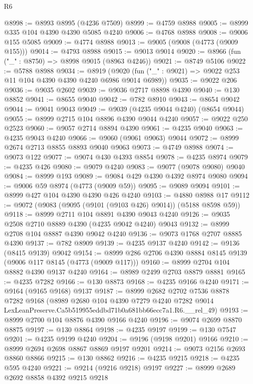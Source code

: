 \begin{lexlean}{R6}
\begin{coremodule}
@8998 := @8993 @8995 (@4236 @7509)
@8999 := @4759 @8988
@9005 := @8999 @335 @104 @4390 @4390 @5085 @4240
@9006 := @4768 @8988
@9008 := @9006 @155 @5085
@9009 := @4774 @8988
@9013 := @9005 (@9008 (@4773 (@9009 @155)))
@9014 := @4793 @8988
@9015 := @9013 @9014
@9020 := @8966 (fun ("_" : @8750) => @8998 @9015 (@8963 @4246))
@9021 := @8749 @5106
@9022 := @5788 @8988
@9034 := @8919
    (@9020 (fun ("_" : @9021) => @9022 @253 @11 @104 @4390 @4390 @4240 @6986 @9014 @6989))
@9035 := @9022 @206
@9036 := @9035 @2602
@9039 := @9036 @2717 @8898 @4390
@9040 := @130 @8852
@9041 := @8655 @9040
@9042 := @782 @8910
@9043 := @8654 @9042
@9044 := @9041 @9043
@9049 := @9039 (@4235 @9044 @4240) (@8654 @9044)
@9055 := @8999 @2715 @104 @8896 @4390 @9044 @4240
@9057 := @9022 @250 @2523
@9060 := @9057 @2714 @8894 @4390
@9061 := @4235 @9040
@9063 := @4235 @9043 @4240
@9066 := @9060 (@9061 @9063) @9044
@9072 := @8999 @2674 @2713 @8855 @8893 @9040 @9063
@9073 := @4749 @8988
@9074 := @9073 @122
@9077 := @9074 @430 @4393 @8854
@9078 := @4235 @8974
@9079 := @4235 @426
@9080 := @9079 @4240
@9083 := @9077 (@9078 @9080) @9040
@9084 := @8999 @193
@9089 := @9084 @429 @4390 @4392 @8974 @9080
@9094 := @9006 @59 @8974 (@4773 (@9009 @59))
@9095 := @9089 @9094
@9101 := @8999 @427 @104 @4390 @4390 @426 @4240
@9103 := @4880 @8988 @17
@9112 := @9072 (@9083 (@9095 (@9101 (@9103 @426) @9014)) (@5188 @8598 @59))
@9118 := @8999 @2711 @104 @8891 @4390 @9043 @4240
@9126 := @9035 @2508 @2710 @8889 @4390 (@4235 @9042 @4240) @9043
@9132 := @8999 @2708 @104 @8887 @4390 @9042 @4240
@9136 := @9073 @1768 @2707 @8885 @4390
@9137 := @782 @8909
@9139 := @4235 @9137 @4240
@9142 := @9136 (@8415 @9139) @9042
@9154 := @8999 @286 @2706 @4390 @8884 @8145 @9139 (@9006 @117 @8145 (@4773 (@9009 @117)))
@9160 := @8999 @2704 @104 @8882 @4390 @9137 @4240
@9164 := @8989 @2499 @2703 @8879 @8881
@9165 := @4235 @7282
@9166 := @130 @8873
@9168 := @4235 @9166 @4240
@9171 := @9164 (@9165 @9168) @9137
@9187 := @8999
    @2682
    @2702
    @7536
    @8878
    @7282
    @9168
    (@8989
      @2680
      @104
      @4390
      @7279
      @4240
      @7282
      @9014
      LexLeanPreserve.Ca5b519955eddbd71b0a681bb66ecc7a1.R6.__rel_49)
@9193 := @8999 @2700 @104 @8876 @4390 @9166 @4240
@9196 := @9074 @2699 @8870 @8875
@9197 := @130 @8864
@9198 := @4235 @9197
@9199 := @130 @7547
@9201 := @4235 @9199 @4240
@9204 := @9196 (@9198 @9201) @9166
@9210 := @8999 @2694 @2698 @8867 @8869 @9197 @9201
@9214 := @9073 @2156 @2693 @8860 @8866
@9215 := @130 @8862
@9216 := @4235 @9215
@9218 := @4235 @595 @4240
@9221 := @9214 (@9216 @9218) @9197
@9227 := @8999 @2689 @2692 @8858 @4392 @9215 @9218

\end{coremodule}
\end{lexlean}
